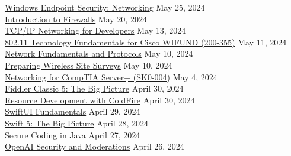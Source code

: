 \documentclass[10pt]{res} %
\begin{document}
\begin{resume}
\href{https://bjdelacruz.dev/files/certificates/pluralsight/Windows_Endpoint_Security_-_Networking.pdf}{\color{blue}Windows Endpoint Security: Networking} \hfill May 25, 2024 \\
\href{https://bjdelacruz.dev/files/certificates/pluralsight/Introduction_to_Firewalls.pdf}{\color{blue}Introduction to Firewalls} \hfill May 20, 2024 \\
\href{https://bjdelacruz.dev/files/certificates/pluralsight/TCP_IP_Networking_for_Developers.pdf}{\color{blue}TCP/IP Networking for Developers} \hfill May 13, 2024 \\
\href{https://bjdelacruz.dev/files/certificates/pluralsight/802_11_Technology_Fundamentals_for_Cisco_WIFUND.pdf}{\color{blue}802.11 Technology Fundamentals for Cisco WIFUND (200-355)} \hfill May 11, 2024 \\
\href{https://bjdelacruz.dev/files/certificates/pluralsight/Network_Fundamentals_and_Protocols.pdf}{\color{blue}Network Fundamentals and Protocols} \hfill May 10, 2024 \\
\href{https://bjdelacruz.dev/files/certificates/pluralsight/Preparing_Wireless_Site_Surveys.pdf}{\color{blue}Preparing Wireless Site Surveys} \hfill May 10, 2024 \\
\href{https://bjdelacruz.dev/files/certificates/pluralsight/Networking_for_CompTIA_Server_Plus.pdf}{\color{blue}Networking for CompTIA Server+ (SK0-004)} \hfill May 4, 2024 \\
\href{https://bjdelacruz.dev/files/certificates/pluralsight/Fiddler_Classic_5_-_The_Big_Picture.pdf}{\color{blue}Fiddler Classic 5: The Big Picture} \hfill April 30, 2024 \\
\href{https://bjdelacruz.dev/files/certificates/pluralsight/Resource_Development_with_ColdFire.pdf}{\color{blue}Resource Development with ColdFire} \hfill April 30, 2024 \\
\href{https://bjdelacruz.dev/files/certificates/pluralsight/SwiftUI_Fundamentals.pdf}{\color{blue}SwiftUI Fundamentals} \hfill April 29, 2024 \\
\href{https://bjdelacruz.dev/files/certificates/pluralsight/Swift_5_-_The_Big_Picture.pdf}{\color{blue}Swift 5: The Big Picture} \hfill April 28, 2024 \\
\href{https://bjdelacruz.dev/files/certificates/pluralsight/Secure_Coding_in_Java.pdf}{\color{blue}Secure Coding in Java} \hfill April 27, 2024 \\
\href{https://bjdelacruz.dev/files/certificates/pluralsight/OpenAI_Security_and_Moderations.pdf}{\color{blue}OpenAI Security and Moderations} \hfill April 26, 2024 \\

\end{resume}
\end{document}
